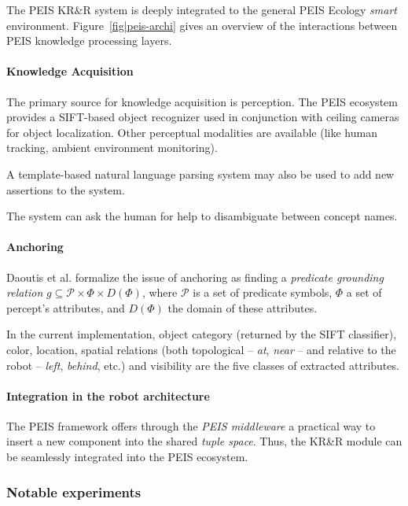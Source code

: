 The PEIS KR\&R system is deeply integrated to the general PEIS Ecology
\emph{smart} environment. Figure~\ref{fig|peis-archi} gives an overview of the
interactions between PEIS knowledge processing layers.

\paragraph{Knowledge Acquisition} The primary source for knowledge acquisition
is perception.  The PEIS ecosystem provides a SIFT-based object recognizer used
in conjunction with ceiling cameras for object localization.  Other perceptual
modalities are available (like human tracking, ambient environment monitoring).

A template-based natural language parsing system may also be used to add new
assertions to the system.

The system can ask the human for help to disambiguate between concept names.

\paragraph{Anchoring} Daoutis et al. formalize the issue of anchoring as
finding a \emph{predicate grounding relation} $g \subseteq \mathcal{P} \times
\Phi \times D(\Phi)$, where $\mathcal{P}$ is a set of predicate symbols, $\Phi$
a set of percept's attributes, and $D(\Phi)$ the domain of these attributes.

In the current implementation, object category (returned by the SIFT
classifier), color, location, spatial relations (both topological -- \emph{at},
\emph{near} -- and relative to the robot -- \emph{left}, \emph{behind}, etc.)
and visibility are the five classes of extracted attributes.

\paragraph{Integration in the robot architecture}
\label{sect|peis-integration}

The PEIS framework offers through the \emph{PEIS middleware} a practical way to
insert a new component into the shared \emph{tuple space}.  Thus, the KR\&R
module can be seamlessly integrated into the PEIS ecosystem.

\subsubsection{Notable experiments}
\label{sect|peis-expe}

